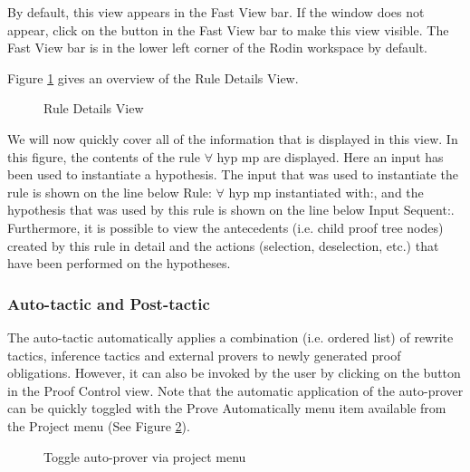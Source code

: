 By default, this view appears in the Fast View bar. If the window does not appear, click on the  button in the Fast View bar to make this view visible. The Fast View bar is in the lower left corner of the Rodin workspace by default.

Figure \ref{fig_ref_01_proving_perspective10} gives an overview of the \textsf{Rule Details View}.

\begin{figure}[!ht]
\begin{center}
	\caption{Rule Details View}
	\label{fig_ref_01_proving_perspective10}
\end{center}
\end{figure}

We will now quickly cover all of the information that is displayed in this view. In this figure, the contents of the rule \textsf{$\forall$ hyp mp} are displayed. Here an input has been used to instantiate a hypothesis. The input that was used to instantiate the rule is shown on the line below \textsf{Rule: $\forall$ hyp mp instantiated with:}, and the hypothesis that was used by this rule is shown on the line below \textsf{Input Sequent:}. Furthermore, it is possible to view the antecedents (i.e. child proof tree nodes) created by this rule in detail and the actions (selection, deselection, etc.) that have been performed on the hypotheses. 

\subsubsection{Auto-tactic and Post-tactic}

The auto-tactic automatically applies a combination (i.e. ordered list) of rewrite tactics, inference tactics and external provers to newly generated proof obligations. However, it can also be invoked by the user by clicking on the  button in the \textsf{Proof Control} view. Note that the automatic application of the auto-prover can be quickly toggled with the \textsf{Prove Automatically} menu item available from the \textsf{Project} menu (See Figure \ref{fig_ref_01_proving_perspective11}).

\begin{figure}[!ht]
\begin{center}
	\caption{Toggle auto-prover via project menu}
	\label{fig_ref_01_proving_perspective11}
\end{center}
\end{figure}

